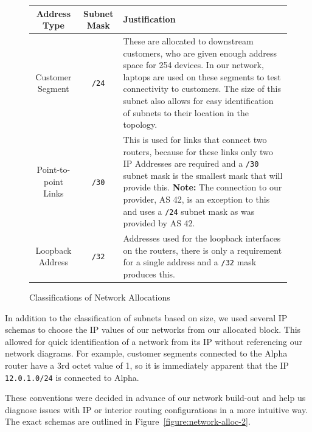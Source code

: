 \begin{figure}[!ht]
    \caption{Classifications of Network Allocations}
    \label{figure:network-alloc-1}
    \centering
    \begin{tabular}{|c|c|p{5.5cm}|}

        \hline
        \textbf{Address Type} & \textbf{Subnet Mask} & \textbf{Justification} \\

        \hline
        Customer Segment & \texttt{/24} & These are allocated to downstream
        customers, who are given enough address space for 254 devices. In our network,
        laptops are used on these segments to test connectivity to customers. The size
        of this subnet also allows for easy identification of subnets to their location
        in the topology.\\

        \hline
        Point-to-point Links & \texttt{/30} & This is used for links that
        connect two routers, because for these links only two IP Addresses are required
        and a \texttt{/30} subnet mask is the smallest mask that will provide this.
        \textbf{Note:} The connection to our provider, AS 42, is an exception to this
        and uses a \texttt{/24} subnet mask as was provided by AS 42.\\

        \hline
        Loopback Address & \texttt{/32} & Addresses used for the loopback
        interfaces on the routers, there is only a requirement for a single address and
        a \texttt{/32} mask produces this.\\

        \hline
    \end{tabular}
\end{figure}
In addition to the classification of subnets based on size, we used several IP
schemas to choose the IP values of our networks from our allocated block. This
allowed for quick identification of a network from its IP without referencing
our network diagrams. For example, customer segments connected to the Alpha
router have a 3rd octet value of 1, so it is immediately apparent that the IP
\texttt{12.0.1.0/24} is connected to Alpha.

These conventions were decided in advance of our network build-out and help us
diagnose issues with IP or interior routing configurations in a more intuitive
way. The exact schemas are outlined in Figure~\ref{figure:network-alloc-2}.

